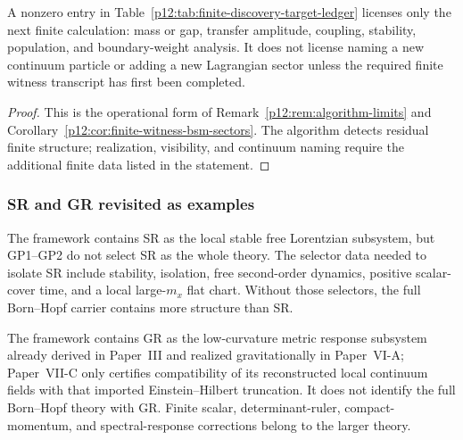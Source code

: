 \documentclass[12pt,a4paper]{article}
\begin{document}
\begin{corollary}
\label{p12:cor:no-particle-claim-from-witness-alone}
A nonzero entry in Table~\ref{p12:tab:finite-discovery-target-ledger} licenses
only the next finite calculation: mass or gap, transfer amplitude, coupling,
stability, population, and boundary-weight analysis.  It does not license naming
a new continuum particle or adding a new Lagrangian sector unless the required
finite witness transcript has first been completed.
\end{corollary}

\begin{proof}
This is the operational form of Remark~\ref{p12:rem:algorithm-limits} and
Corollary~\ref{p12:cor:finite-witness-bsm-sectors}.  The algorithm detects
residual finite structure; realization, visibility, and continuum naming require
the additional finite data listed in the statement.
\end{proof}


\subsubsection{SR and GR revisited as examples}

\begin{remark}
\label{p12:rem:sr-contained-not-unique}
The framework contains SR as the local stable free Lorentzian subsystem, but GP1--GP2 do not select SR as the whole theory.  The selector data needed to isolate SR include stability, isolation, free second-order dynamics, positive scalar-cover time, and a local large-\(m_x\) flat chart.  Without those selectors, the full Born--Hopf carrier contains more structure than SR.
\end{remark}

\begin{remark}
\label{p12:rem:gr-contained-low-curvature}
The framework contains GR as the low-curvature metric response subsystem already derived in Paper~III and realized gravitationally in Paper~VI-A; Paper~VII-C only certifies compatibility of its reconstructed local continuum fields with that imported Einstein--Hilbert truncation.  It does not identify the full Born--Hopf theory with GR.  Finite scalar, determinant-ruler, compact-momentum, and spectral-response corrections belong to the larger theory.
\end{remark}
\end{document}
